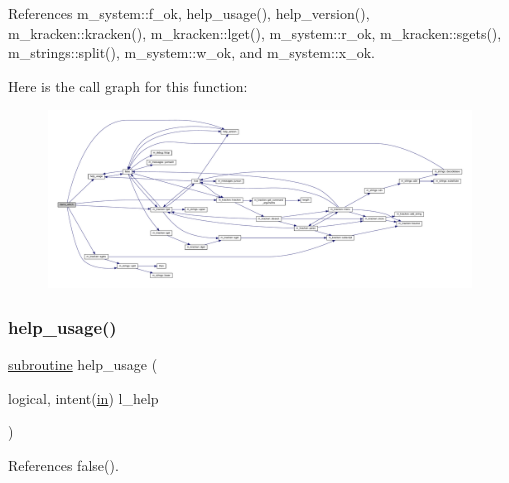 References m\+\_\+system\+::f\+\_\+ok, help\+\_\+usage(), help\+\_\+version(), m\+\_\+kracken\+::kracken(), m\+\_\+kracken\+::lget(), m\+\_\+system\+::r\+\_\+ok, m\+\_\+kracken\+::sgets(), m\+\_\+strings\+::split(), m\+\_\+system\+::w\+\_\+ok, and m\+\_\+system\+::x\+\_\+ok.

Here is the call graph for this function\+:
\nopagebreak
\begin{figure}[H]
\begin{center}
\leavevmode
\includegraphics[width=350pt]{__which_8f90_a33eb841ba91373377445b770f9ec6ad7_cgraph}
\end{center}
\end{figure}
\mbox{\label{__which_8f90_a3e09a3b52ee8fb04eeb93fe5761626a8}} 
\subsubsection{\texorpdfstring{help\+\_\+usage()}{help\_usage()}}
{\footnotesize\ttfamily \hyperlink{M__stopwatch_83_8txt_acfbcff50169d691ff02d4a123ed70482}{subroutine} help\+\_\+usage (\begin{DoxyParamCaption}\item[{logical, intent(\hyperlink{M__journal_83_8txt_afce72651d1eed785a2132bee863b2f38}{in})}]{l\+\_\+help }\end{DoxyParamCaption})}



References false().

